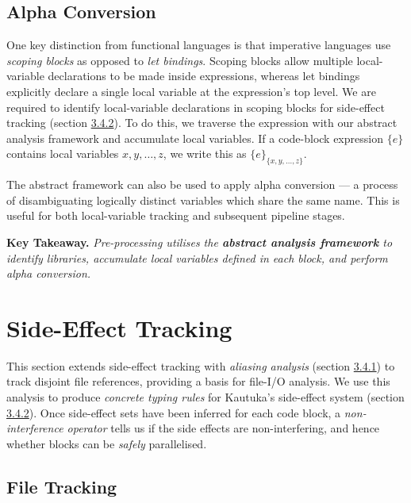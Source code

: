 \subsection{Alpha Conversion}

\label{sec:3.3.2}

One key distinction from functional languages is that imperative languages use \textit{scoping blocks} as opposed to \textit{let bindings}. Scoping blocks allow multiple local-variable declarations to be made inside expressions, whereas let bindings explicitly declare a single local variable at the expression's top level. We are required to identify local-variable declarations in scoping blocks for side-effect tracking (section \hyperref[sec:3.4.2]{3.4.2}). To do this, we traverse the expression with our abstract analysis framework and accumulate local variables. If a code-block expression \( \{ e \} \) contains local variables \( x, y, \ldots, z \), we write this as \( \{ e \}_{\{ x, y, \ldots, z \}} \).

The abstract framework can also be used to apply alpha conversion --- a process of disambiguating logically distinct variables which share the same name. This is useful for both local-variable tracking and subsequent pipeline stages.

\textbf{Key Takeaway.} \textit{Pre-processing utilises the \textbf{abstract analysis framework} to identify libraries, accumulate local variables defined in each block, and perform alpha conversion.}

\section{Side-Effect Tracking}

\label{sec:3.4}

This section extends side-effect tracking with \textit{aliasing analysis} (section \hyperref[sec:3.4.1]{3.4.1}) to track disjoint file references, providing a basis for file-I/O analysis. We use this analysis to produce \textit{concrete typing rules} for Kautuka's side-effect system (section \hyperref[sec:3.4.2]{3.4.2}). Once side-effect sets have been inferred for each code block, a \textit{non-interference operator} tells us if the side effects are non-interfering, and hence whether blocks can be \textit{safely} parallelised.

\subsection{File Tracking}


